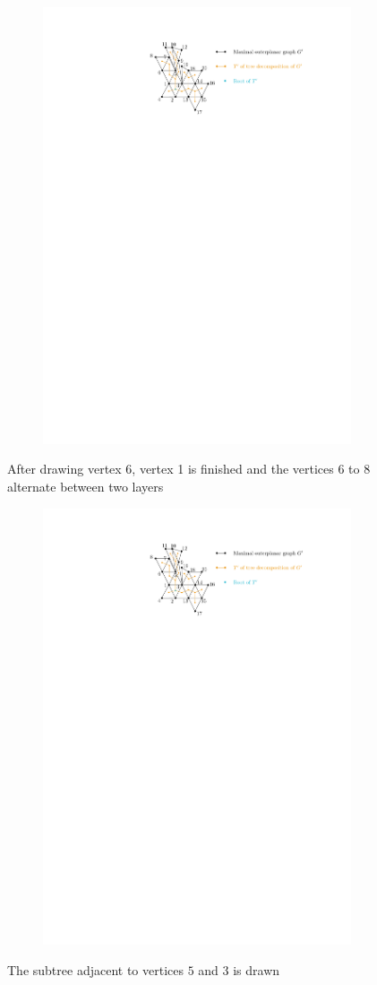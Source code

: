\begin{figure}[H]
	\centering
	\begin{subfigure}{\textwidth}
		\centering
		\includegraphics[page=5,width=0.7\linewidth]{graphics/maximal_outerplanar_example_drawings.pdf}
	\end{subfigure}
	\caption{After drawing vertex $6$, vertex 1 is finished and the vertices 6 to 8 alternate between two layers}
\end{figure}

\begin{figure}[H]
	\centering
	\begin{subfigure}{\textwidth}
		\centering
		\includegraphics[page=6,width=0.7\linewidth]{graphics/maximal_outerplanar_example_drawings.pdf}
	\end{subfigure}
	\caption{The subtree adjacent to vertices $5$ and $3$ is drawn}
\end{figure}

